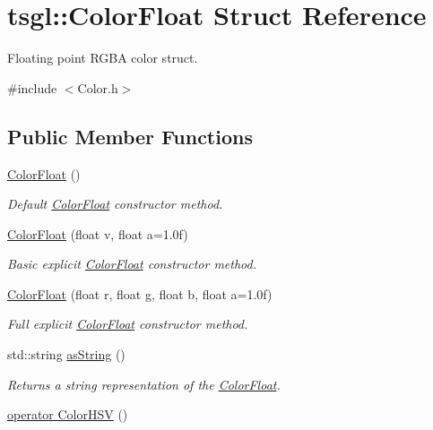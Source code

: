 \hypertarget{structtsgl_1_1_color_float}{\section{tsgl\-:\-:Color\-Float Struct Reference}
\label{structtsgl_1_1_color_float}
}


Floating point R\-G\-B\-A color struct.  




{\ttfamily \#include $<$Color.\-h$>$}

\subsection*{Public Member Functions}
\begin{DoxyCompactItemize}
\item 
\hyperlink{structtsgl_1_1_color_float_a22e82c71a0feedbb7b3e3a7a73b80e30}{Color\-Float} ()
\begin{DoxyCompactList}\small\item\em Default \hyperlink{structtsgl_1_1_color_float}{Color\-Float} constructor method. \end{DoxyCompactList}\item 
\hyperlink{structtsgl_1_1_color_float_a134643b43f1d8acaed32095f04942140}{Color\-Float} (float v, float a=1.\-0f)
\begin{DoxyCompactList}\small\item\em Basic explicit \hyperlink{structtsgl_1_1_color_float}{Color\-Float} constructor method. \end{DoxyCompactList}\item 
\hyperlink{structtsgl_1_1_color_float_a6c46a2073d9e208aa3f07cc04565a489}{Color\-Float} (float r, float g, float b, float a=1.\-0f)
\begin{DoxyCompactList}\small\item\em Full explicit \hyperlink{structtsgl_1_1_color_float}{Color\-Float} constructor method. \end{DoxyCompactList}\item 
std\-::string \hyperlink{structtsgl_1_1_color_float_a1048e8773d65fa1554bc8782e76527ed}{as\-String} ()
\begin{DoxyCompactList}\small\item\em Returns a string representation of the \hyperlink{structtsgl_1_1_color_float}{Color\-Float}. \end{DoxyCompactList}\item 
\hyperlink{structtsgl_1_1_color_float_a4d74b061239eed7eb351422c18e33a37}{operator Color\-H\-S\-V} ()

\end{DoxyCompactItemize}
